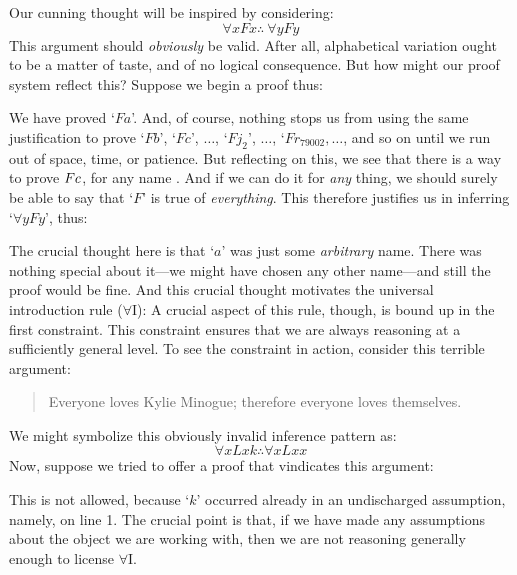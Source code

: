 Our cunning thought will be inspired by considering:
$$\forall x Fx \therefore\ \forall y Fy$$
This argument should \emph{obviously} be valid. After all, alphabetical variation ought to be a matter of taste, and of no logical consequence. But how might our proof system reflect this? Suppose we begin a proof thus:
\begin{pf}
	 
\end{pf}
We have proved `$Fa$'. And, of course, nothing stops us from using the same justification to prove `$Fb$', `$Fc$', $\ldots$, `$Fj_2$', $\ldots$, `$Fr_{79002}, \ldots$, and so on until we run out of space, time, or patience. But reflecting on this, we see that there is a way to prove $Fc$, for any name . And if we can do it for \emph{any} thing, we should surely be able to say that `$F$' is true of \emph{everything}. This therefore justifies us in inferring `$\forall y Fy$', thus:
\begin{pf}
	 
	 
\end{pf}
The crucial thought here is that `$a$' was just some \emph{arbitrary} name. There was nothing special about it---we might have chosen any other name---and still the proof would be fine. And this crucial thought motivates the universal introduction rule ($\forall$I):
A crucial aspect of this rule, though, is bound up in the first constraint. This constraint ensures that we are always reasoning at a sufficiently general level.
To see the constraint in action, consider this terrible argument:
	\begin{quote}
		Everyone loves Kylie Minogue; therefore everyone loves themselves.
	\end{quote}
We might symbolize this obviously invalid inference pattern as:
$$\forall x Lxk \therefore \forall x Lxx$$
Now, suppose we tried to offer a proof that vindicates this argument:
\begin{pf}
	 
	 
\end{pf}\noindent
This is not allowed, because `$k$' occurred already in an undischarged assumption, namely, on line 1. The crucial point is that, if we have made any assumptions about the object we are working with, then we are not reasoning generally enough to license $\forall$I.

